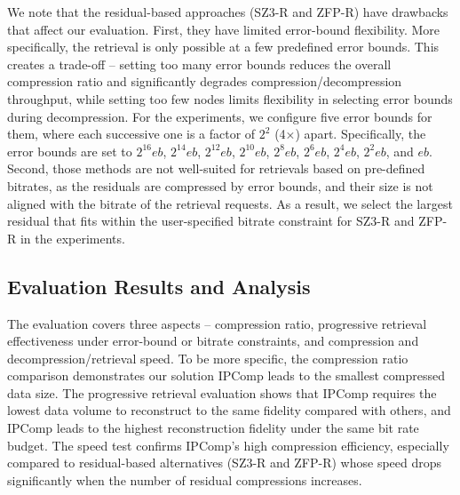 We note that the residual-based approaches (SZ3-R and ZFP-R) have drawbacks that affect our evaluation. 
First, they have limited error-bound flexibility. More specifically, the retrieval is only possible at a few predefined error bounds. This creates a trade-off -- setting too many error bounds reduces the overall compression ratio and significantly degrades compression/decompression throughput, while setting too few nodes limits flexibility in selecting error bounds during decompression. For the experiments, we configure five error bounds for them, where each successive one is a factor of $2^2$ (4×) apart. Specifically, the error bounds are set to $2^{16}eb$, $2^{14}eb$, $2^{12}eb$, $2^{10}eb$, $2^{8}eb$, $2^{6}eb$, $2^{4}eb$, $2^{2}eb$, and $eb$.
Second, those methods are not well-suited for retrievals based on pre-defined bitrates, as the residuals are compressed by error bounds, and their size is not aligned with the bitrate of the retrieval requests. As a result, we select the largest residual that fits within the user-specified bitrate constraint for SZ3-R and ZFP-R in the experiments.


\subsection{Evaluation Results and Analysis}
The evaluation covers three aspects -- compression ratio, progressive retrieval effectiveness under error-bound or bitrate constraints, and compression and decompression/retrieval speed.  To be more specific, the compression ratio comparison demonstrates our solution IPComp leads to the smallest compressed data size. The progressive retrieval evaluation shows that IPComp requires the lowest data volume to reconstruct to the same fidelity compared with others, and IPComp leads to the highest reconstruction fidelity under the same bit rate budget. The speed test confirms IPComp's high compression efficiency, especially compared to residual-based alternatives (SZ3-R and ZFP-R) whose speed drops significantly when the number of residual compressions increases.


